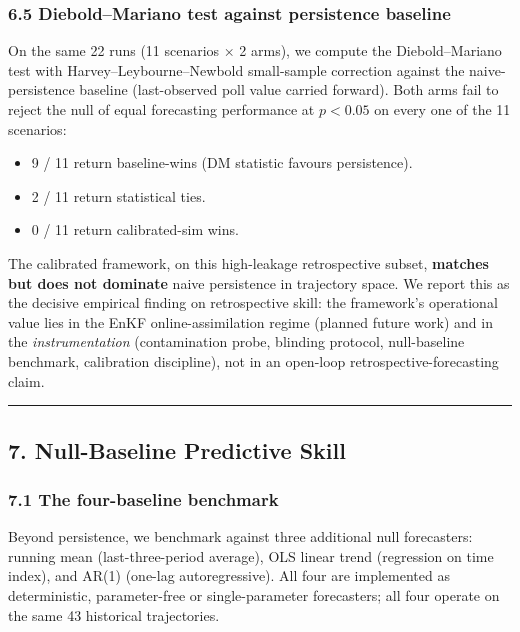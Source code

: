 \documentclass[
]{article}
\providecommand{\tightlist}{%
  \setlength{\itemsep}{0pt}\setlength{\parskip}{0pt}}
\begin{document}
\subsubsection{6.5 Diebold--Mariano test against persistence
baseline}\label{dieboldmariano-test-against-persistence-baseline}

On the same 22 runs (11 scenarios × 2 arms), we compute the
Diebold--Mariano test with Harvey--Leybourne--Newbold small-sample
correction against the naive-persistence baseline (last-observed poll
value carried forward). Both arms fail to reject the null of equal
forecasting performance at \(p < 0.05\) on every one of the 11
scenarios:

\begin{itemize}
\tightlist
\item
  9 / 11 return baseline-wins (DM statistic favours persistence).
\item
  2 / 11 return statistical ties.
\item
  0 / 11 return calibrated-sim wins.
\end{itemize}

The calibrated framework, on this high-leakage retrospective subset,
\textbf{matches but does not dominate} naive persistence in trajectory
space. We report this as the decisive empirical finding on retrospective
skill: the framework's operational value lies in the EnKF
online-assimilation regime (planned future work) and in the
\emph{instrumentation} (contamination probe, blinding protocol,
null-baseline benchmark, calibration discipline), not in an open-loop
retrospective-forecasting claim.

\begin{center}\rule{0.5\linewidth}{0.5pt}\end{center}

\subsection{7. Null-Baseline Predictive
Skill}\label{null-baseline-predictive-skill}

\subsubsection{7.1 The four-baseline
benchmark}\label{the-four-baseline-benchmark}

Beyond persistence, we benchmark against three additional null
forecasters: running mean (last-three-period average), OLS linear trend
(regression on time index), and AR(1) (one-lag autoregressive). All four
are implemented as deterministic, parameter-free or single-parameter
forecasters; all four operate on the same 43 historical trajectories.
\end{document}
